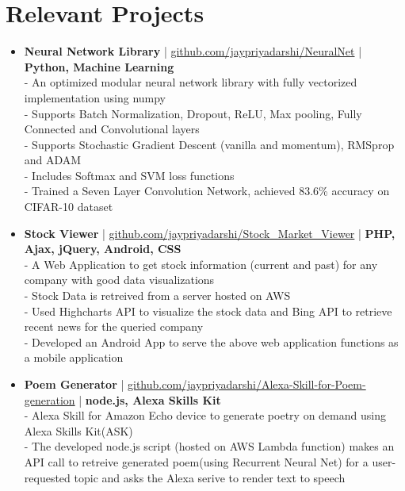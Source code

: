 \section{Relevant Projects}
\begin{itemize}
 \item \textbf{Neural Network Library} | \href{https://github.com/jaypriyadarshi/NeuralNet}{github.com/jaypriyadarshi/NeuralNet} | \textbf{Python, Machine Learning}\\
 - An optimized modular neural network library with fully vectorized implementation using numpy\\
 - Supports Batch Normalization, Dropout, ReLU, Max pooling, Fully Connected and Convolutional layers\\
 - Supports Stochastic Gradient Descent (vanilla and momentum), RMSprop and ADAM\\
 - Includes Softmax and SVM loss functions\\
 - Trained a Seven Layer Convolution Network, achieved 83.6\% accuracy on CIFAR-10 dataset 


 \item \textbf{Stock Viewer} | \href{https://github.com/jaypriyadarshi/Stock_Market_Viewer}{github.com/jaypriyadarshi/Stock\_Market\_Viewer} | \textbf{PHP, Ajax, jQuery, Android, CSS}\\
 - A Web Application to get stock information (current and past) for any company with good data visualizations\\
 - Stock Data is retreived from a server hosted on AWS\\
 - Used Highcharts API to visualize the stock data and Bing API to retrieve recent news for the queried company\\
 - Developed an Android App to serve the above web application functions as a mobile application

 \item \textbf{Poem Generator} | \href{https://github.com/jaypriyadarshi/Alexa-Skill-for-Poem-generation}{github.com/jaypriyadarshi/Alexa-Skill-for-Poem-generation} | \textbf{node.js, Alexa Skills Kit}\\
 - Alexa Skill for Amazon Echo device to generate poetry on demand using Alexa Skills Kit(ASK)\\
 - The developed node.js script (hosted on AWS Lambda function) makes an API call to retreive generated poem(using Recurrent Neural Net) for a user-requested topic and asks the Alexa serive to render text to speech


\end{itemize}
